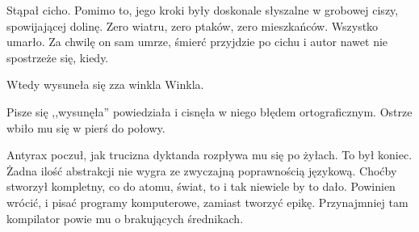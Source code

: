 Stąpał cicho. Pomimo to, jego kroki były doskonale słyszalne w grobowej ciszy, spowijającej dolinę.
Zero wiatru, zero ptaków, zero mieszkańców. Wszystko umarło.
Za chwilę on sam umrze, śmierć przyjdzie po cichu i autor nawet nie spostrzeże się, kiedy.

Wtedy wysuneła się zza winkla Winkla. 

\begin{dialogue}
\ds{} Pisze się ,,wysunęła'' \dm{} powiedziała i cisnęła w niego błędem ortograficznym. Ostrze wbiło mu się w pierś do połowy.
\end{dialogue}
Antyrax poczuł, jak trucizna dyktanda rozpływa mu się po żyłach. To był koniec. Żadna ilość abstrakcji nie wygra ze zwyczajną poprawnością językową.
Choćby stworzył kompletny, co do atomu, świat, to i tak niewiele by to dało. 
Powinien wrócić, i pisać programy komputerowe, zamiast tworzyć epikę. Przynajmniej tam kompilator powie mu o brakujących średnikach.

